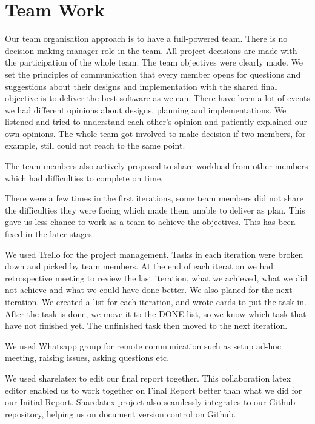 \documentclass[11pt]{article}
\begin{document}
\pagebreak
\section{Team Work}
Our team organisation approach is to have a full-powered team. There is no decision-making manager role in the team. All project decisions are made with the participation of the whole team. 
The team objectives were clearly made. We set the principles of communication that  every member opens for questions and suggestions about their designs and implementation with the shared final  objective is to deliver the best software as we can. 
There have been a lot of events we had different opinions about designs, planning and implementations. We listened and tried to understand each other's opinion and patiently explained our own opinions. The whole team got involved to make decision if two members, for example, still could not reach to the same point. 

The team members also actively proposed to share workload from other members which had difficulties to complete on time.

There were a few times in the first iterations, some team members did not share the difficulties they were facing which made them unable to deliver as plan. This gave us less chance to work as a team to achieve the objectives. This  has been fixed in the later stages. 

We used Trello for the project management. Tasks in each iteration were broken down and picked by team members. At the end of each iteration we had retrospective meeting to review the last iteration, what we achieved, what we did not achieve and what we could have done better. We also planed for the next iteration. We created a list for each iteration, and wrote cards to put the task in. After the task is done, we move it to the DONE list, so we know which task that have not finished yet. The unfinished task then moved to the next iteration.

We used Whatsapp group for remote communication such as setup ad-hoc meeting, raising issues, asking questions etc.
 

We used sharelatex to edit our final report together. This collaboration latex editor enabled us to work together on Final Report better than what we did for our Initial Report. Sharelatex project also seamlessly integrates to our Github repository, helping us on document version control on Github. 
\end{document}
